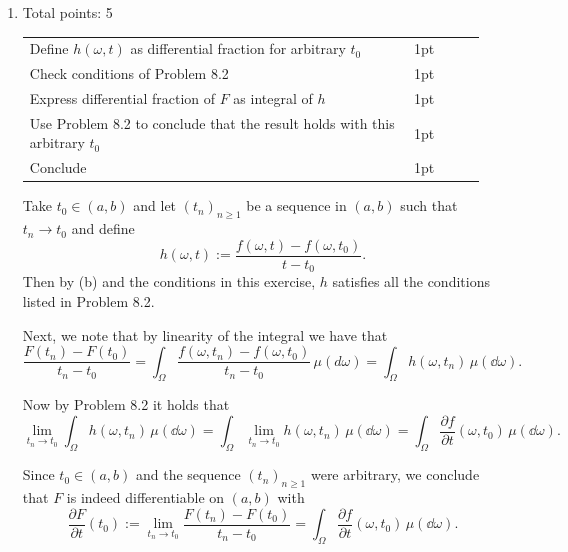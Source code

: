 \documentclass{lecturenotes}
\newcommand{\rubric}[1]{#1}
\begin{document}
\begin{enumerate}[label={(\alph*)}]
	Taking the modulus on both sides, we obtain
	\[
		\left|\frac{f(\omega,t)-f(\omega,t_0)}{t-t_0}\right| \le |(\partial f/\partial t)(\omega,\tau)|\le g(\omega)\qquad\text{for all $\omega\in\Omega$}.
	\]
	\item \rubric{ Total points: 5 \hfill
	
	\begin{tabular}{p{0.8\linewidth}p{0.15\linewidth}}
	\hline
	Define $h(\omega,t)$ as differential fraction for arbitrary $t_0$ & 1pt\\
	Check conditions of Problem 8.2 & 1pt\\
	Express differential fraction of $F$ as integral of $h$ & 1pt\\
	Use Problem 8.2 to conclude that the result holds with this arbitrary $t_0$ & 1pt\\
	Conclude & 1pt\\
	\hline
	\end{tabular}
	
	}
	
	Take $t_0 \in (a,b)$ and let $(t_n)_{n \ge 1}$ be a sequence in $(a,b)$ such that $t_n \to t_0$ and define
	\[
		h(\omega, t) := \frac{f(\omega, t) - f(\omega, t_0)}{t - t_0}.
	\] 
	Then by (b) and the conditions in this exercise, $h$ satisfies all the conditions listed in Problem 8.2.
	
	Next, we note that by linearity of the integral we have that
	\[
		\frac{F(t_n) - F(t_0)}{t_n - t_0} = \int_\Omega \frac{f(\omega, t_n) - f(\omega, t_0)}{t_n - t_0} \, \mu(d \omega)
		= \int_\Omega h(\omega, t_n) \, \mu(\dd \omega).
	\]
	
	Now by Problem 8.2 it holds that 
	\[
		\lim_{t_n \to t_0} \int_\Omega h(\omega, t_n) \, \mu(\dd \omega) 
		= \int_\Omega \lim_{t_n \to t_0} h(\omega, t_n) \, \mu(\dd \omega) = \int_\Omega \frac{\partial f}{\partial t}(\omega, t_0) \, \mu(\dd \omega).
	\]
	
	Since $t_0 \in(a,b)$ and the sequence $(t_n)_{n\ge 1}$ were arbitrary, we conclude that $F$ is indeed differentiable on $(a,b)$ with 
	\[
		\frac{\partial F}{\partial t}(t_0) := \lim_{t_n \to t_0} \frac{F(t_n) - F(t_0)}{t_n - t_0} 
		= \int_\Omega \frac{\partial f}{\partial t}(\omega,t_0)\,\mu(\dd\omega).
	\]
\end{enumerate}

\bigskip
\end{document}
